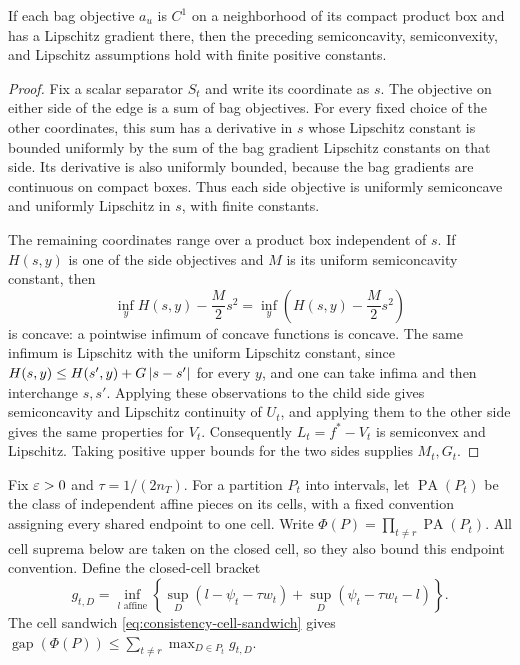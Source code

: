 \begin{proposition}
\label{prop:scalar-covering-smooth}
If each bag objective $a_u$ is $C^1$ on a neighborhood of its compact
product box and has a Lipschitz gradient there, then the preceding
semiconcavity, semiconvexity, and Lipschitz assumptions hold with finite
positive constants.
\end{proposition}

\begin{proof}
Fix a scalar separator $S_t$ and write its coordinate as $s$.
The objective on either side of the edge is a sum of bag objectives.
For every fixed choice of the other coordinates, this sum has a
derivative in $s$ whose Lipschitz constant is bounded uniformly by the
sum of the bag gradient Lipschitz constants on that side.
Its derivative is also uniformly bounded, because the bag gradients
are continuous on compact boxes.
Thus each side objective is uniformly semiconcave and uniformly
Lipschitz in $s$, with finite constants.

The remaining coordinates range over a product box independent of
$s$.  If $H(s,y)$ is one of the side objectives and $M$ is its uniform
semiconcavity constant, then
\[
 \inf_y H(s,y)-\frac M2s^2
 =\inf_y\left(H(s,y)-\frac M2s^2\right)
\]
is concave: a pointwise infimum of concave functions is concave.
The same infimum is Lipschitz with the uniform Lipschitz constant,
since $H(s,y)\leq H(s',y)+G\left\lvert s-s'\right\rvert$ for every $y$,
and one can take infima and then interchange $s,s'$.
Applying these observations to the child side gives semiconcavity and
Lipschitz continuity of $U_t$, and applying them to the other side
gives the same properties for $V_t$.
Consequently $L_t=f^*-V_t$ is semiconvex and Lipschitz.
Taking positive upper bounds for the two sides supplies $M_t,G_t$.
\end{proof}

Fix $\varepsilon>0$ and $\tau=1/(2n_T)$.  For a partition $P_t$ into intervals,
let $\operatorname{PA}(P_t)$ be the class of independent affine pieces
on its cells, with a fixed convention assigning every shared endpoint
to one cell.  Write
$\Phi(P)=\prod_{t\ne r}\operatorname{PA}(P_t)$.
All cell suprema below are taken on the closed cell, so they also bound
this endpoint convention.  Define the closed-cell bracket
\begin{equation}
 g_{t,D}=\inf_{l\text{ affine}}
 \left\{\sup_D(l-\psi_t-\tau w_t)
             +\sup_D(\psi_t-\tau w_t-l)\right\}.
 \label{eq:scalar-covering-bracket}
\end{equation}
The cell sandwich \eqref{eq:consistency-cell-sandwich} gives
$\operatorname{gap}(\Phi(P))\leq
\sum_{t\ne r}\max_{D\in P_t}g_{t,D}$.

